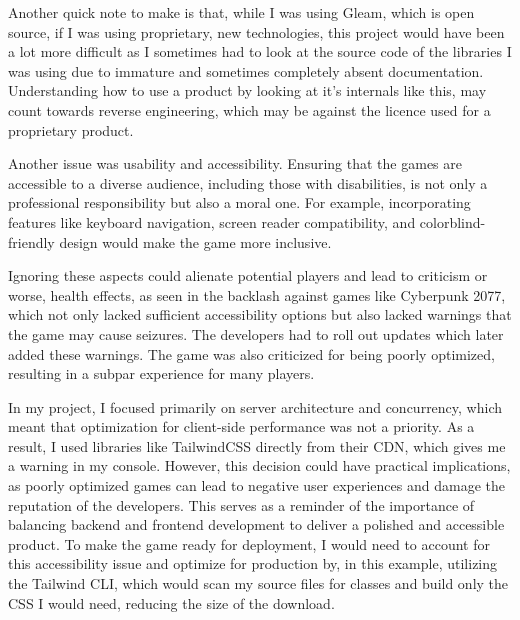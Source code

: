 \documentclass[]{final}
\begin{document}

Another quick note to make is that, while I was using Gleam, which is open source,
if I was using proprietary, new technologies, this project would have been a lot
more difficult as I sometimes had to look at the source code of the libraries I was using
due to immature and sometimes completely absent documentation. Understanding how
to use a product by looking at it's internals like this, may count towards
reverse engineering, which may be against the licence used for a proprietary
product.

Another issue was usability and accessibility.
Ensuring that the games are accessible to a diverse
audience, including those with disabilities, is not only a professional
responsibility but also a moral one. For example, incorporating features like
keyboard navigation, screen reader compatibility, and colorblind-friendly
design would make the game more inclusive.

Ignoring these aspects could
alienate potential players and lead to criticism or worse, health effects, as
seen in the backlash against games like Cyberpunk 2077, which not only lacked
sufficient accessibility options but also lacked warnings that the game
may cause seizures. The developers had to roll out updates which later added
these warnings.%
The game was also criticized for being poorly optimized,
resulting in a subpar experience for many players.

In my project, I focused primarily on server architecture and concurrency,
which meant that optimization for client-side performance was not a
priority. As a result, I used libraries like TailwindCSS directly from
their CDN, which gives me a warning in my console.%
However, this decision could have practical implications,
as poorly optimized games can lead to negative user experiences and
damage the reputation of the developers. This serves as a reminder
of the importance of balancing backend and frontend development to
deliver a polished and accessible product. To make the game ready for
deployment, I would need to account for this accessibility issue and optimize for production
by, in this example, utilizing the Tailwind CLI, which would scan my source files for
classes and build only the CSS I would need, reducing the size of
the download.
\end{document}
